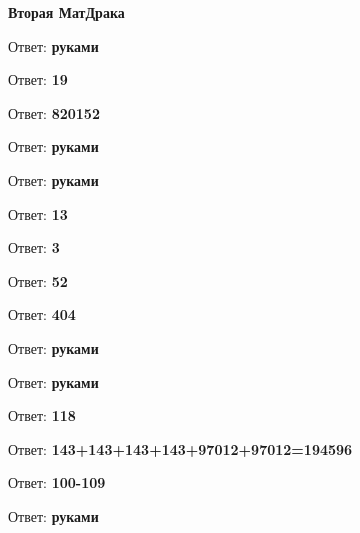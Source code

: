 \centerline{\bf \Huge Вторая МатДрака }

Ответ: \textbf{руками}

Ответ: \textbf{19}

Ответ: \textbf{820152}

Ответ: \textbf{руками}

Ответ: \textbf{руками}

Ответ: \textbf{13}

Ответ: \textbf{3}

Ответ: \textbf{52}

Ответ: \textbf{404}

Ответ: \textbf{руками}

Ответ: \textbf{руками}

Ответ: \textbf{118}

Ответ: \textbf{143+143+143+143+97012+97012=194596}

Ответ: \textbf{100-109}

Ответ: \textbf{руками}